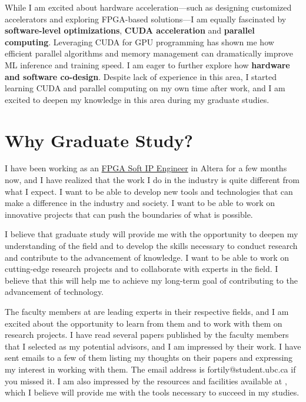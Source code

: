 \documentclass[a4 paper, 10pt]{article}
\begin{document}
While I am excited about hardware acceleration—such as designing customized accelerators and exploring FPGA-based solutions—I am equally fascinated by \textbf{software-level optimizations},  \textbf{CUDA acceleration} and \textbf{parallel computing}. Leveraging CUDA for GPU programming has shown me how efficient parallel algorithms and memory management can dramatically improve ML inference and training speed. I am eager to further explore how \textbf{hardware and software co-design}. Despite lack of experience in this area, I started learning CUDA and parallel computing on my own time after work, and I am excited to deepen my knowledge in this area during my graduate studies.

\section*{Why Graduate Study?}
I have been working as an \hyperref[Altera]{FPGA Soft IP Engineer} in Altera for a few months now, and I have realized that the work I do in the industry is quite different from what I expect. I want to be able to develop {new tools and technologies} that can make a difference in the industry and society. I want to be able to work on {innovative projects} that can push the boundaries of what is possible.

I believe that graduate study will provide me with the opportunity to {deepen my understanding} of the field and to develop the skills necessary to conduct {research} and contribute to the {advancement of knowledge}. I want to be able to work on {cutting-edge research projects} and to collaborate with {experts in the field}. I believe that this will help me to achieve my long-term goal of contributing to the {advancement of technology}.

The faculty members at \theSchoolFullName{} are leading experts in their respective fields, and I am excited about the opportunity to learn from them and to work with them on research projects. I have read several papers published by the faculty members that I selected as my potential advisors, and I am impressed by their work. I have sent emails to a few of them listing my thoughts on their papers and expressing my interest in working with them. The email address is {fortily@student.ubc.ca} if you missed it. I am also impressed by the resources and facilities available at \theSchoolFullName{}, which I believe will provide me with the tools necessary to succeed in my studies.
\end{document}
